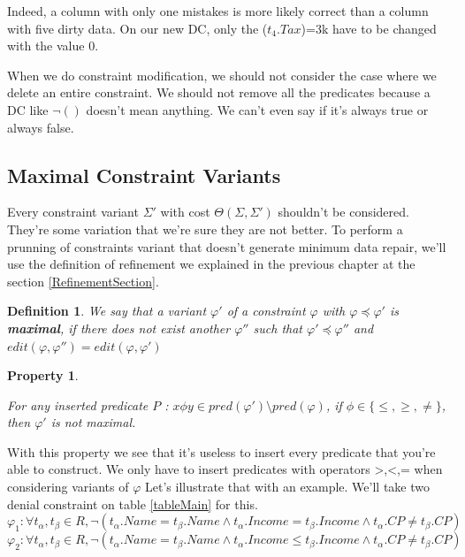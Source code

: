 \documentclass[letterpaper, 12pt]{report}
\newtheorem{mydef}{Definition}
\newtheorem{myprop}{Property}
\begin{document}
Indeed, a column with only one mistakes is more likely correct than a column with five dirty data. On our new DC, only the ($t_4.Tax$)=3k have to be changed with the value 0.

When we do constraint modification, we should not consider the case where we delete an entire constraint.  We should not remove all the predicates because a DC like $\neg()$ doesn't mean anything. We can't even say if it's always true or always false.

\subsection{Maximal Constraint Variants}

	Every constraint variant $\Sigma'$ with cost $\Theta(\Sigma,\Sigma')$ shouldn't be considered. They're some variation that we're sure they are not better. To perform a prunning of constraints variant that doesn't generate minimum data repair, we'll use the definition of refinement we explained in the previous chapter at the section \ref{RefinementSection}.
	
\begin{mydef}\cite{main}
 We say that a variant $\varphi '$ of a constraint $\varphi$ with $\varphi \preceq \varphi'$ is \textbf{maximal}, if there does not exist another $\varphi ''$ such that $\varphi ' \preceq \varphi ''$ and $edit(\varphi,\varphi'') = edit (\varphi,\varphi')$
\end{mydef}

\begin{myprop}\cite{main}

For any inserted predicate $ P $ : $x \phi y \in pred(\varphi ') \setminus pred(\varphi)$, if $\phi \in \{\leq,\geq,\neq \}$, then $\varphi '$ is not maximal.

\end{myprop}

With this property we see that it's useless to insert every predicate that you're able to construct. We only have to insert predicates with operators {>,<,=} when considering variants of $\varphi$ Let's illustrate that with an example. We'll take two denial constraint on table \ref{tableMain} for this.
$$\varphi_1 : \forall t_\alpha,t_\beta \in R, \neg( t_\alpha.Name = t_\beta.Name \wedge t_\alpha.Income = t_\beta.Income \wedge t_\alpha.CP \neq t_\beta.CP )$$
$$\varphi_2 : \forall t_\alpha,t_\beta \in R, \neg( t_\alpha.Name = t_\beta.Name \wedge t_\alpha.Income \leq t_\beta.Income \wedge t_\alpha.CP \neq t_\beta.CP )$$
\end{document}
